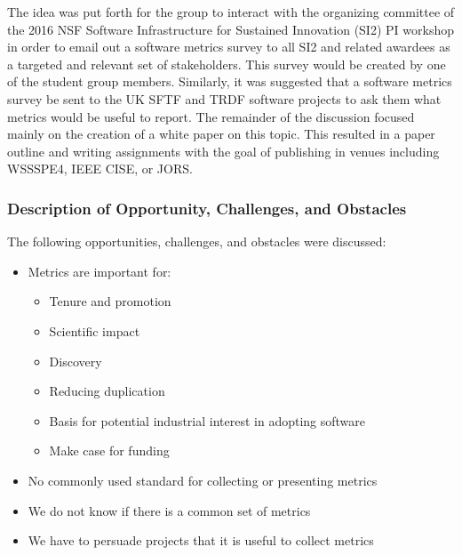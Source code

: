 \smallskip
\noindent
The idea was put forth for the group to interact with the organizing committee
of the 2016 NSF Software Infrastructure for Sustained Innovation (SI2) PI
workshop in order to email out a software metrics survey to all SI2 and related
awardees as a targeted and relevant set of stakeholders. This survey would be
created by one of the student group members. Similarly, it was suggested that a
software metrics survey be sent to the UK SFTF and TRDF software projects to ask
them what metrics would be useful to report. The remainder of the discussion
focused mainly on the creation of a white paper on this topic. This resulted in
a paper outline and writing assignments with the goal of publishing in venues
including WSSSPE4, IEEE CISE, or JORS.



\subsubsection{Description of Opportunity, Challenges, and Obstacles}

The following opportunities, challenges, and obstacles were discussed:
%
\begin{itemize}
\item
Metrics are important for:

\begin{itemize}
\item
        Tenure and promotion

\item
        Scientific impact

\item
        Discovery

\item
        Reducing duplication

\item
        Basis for potential industrial interest in adopting software

\item
        Make case for funding
\end{itemize}

\item
No commonly used standard for collecting or presenting metrics

\item
We do not know if there is a common set of metrics

\item
We have to persuade projects that it is useful to collect metrics

\end{itemize}



